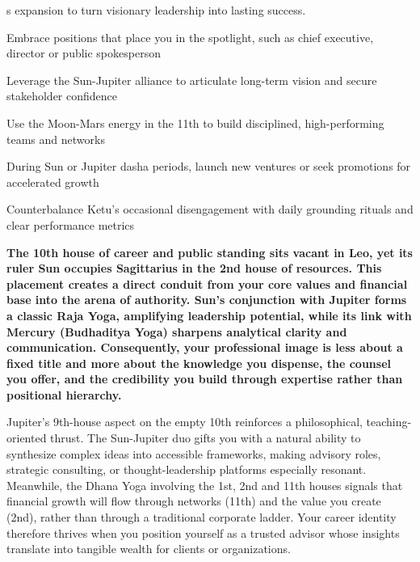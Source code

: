 {\fontsize{9}{13}\selectfont s expansion to turn visionary leadership into lasting success.}\par\vspace{1.8mm}

\begin{diamondlist}
  \item {\fontsize{8.5}{12}\selectfont Embrace positions that place you in the spotlight, such as chief executive, director or public spokesperson}
  \item {\fontsize{8.5}{12}\selectfont Leverage the Sun-Jupiter alliance to articulate long-term vision and secure stakeholder confidence}
  \item {\fontsize{8.5}{12}\selectfont Use the Moon-Mars energy in the 11th to build disciplined, high-performing teams and networks}
  \item {\fontsize{8.5}{12}\selectfont During Sun or Jupiter dasha periods, launch new ventures or seek promotions for accelerated growth}
  \item {\fontsize{8.5}{12}\selectfont Counterbalance Ketu's occasional disengagement with daily grounding rituals and clear performance metrics}
\end{diamondlist}


\label{topic12}

{\fontsize{9.5}{13.8}\selectfont\bfseries\color{DeepSlate} The 10th house of career and public standing sits vacant in Leo, yet its ruler Sun occupies Sagittarius in the 2nd house of resources. This placement creates a direct conduit from your core values and financial base into the arena of authority. Sun's conjunction with Jupiter forms a classic Raja Yoga, amplifying leadership potential, while its link with Mercury (Budhaditya Yoga) sharpens analytical clarity and communication. Consequently, your professional image is less about a fixed title and more about the knowledge you dispense, the counsel you offer, and the credibility you build through expertise rather than positional hierarchy.}\par\vspace{2mm}

{\fontsize{9}{13}\selectfont Jupiter's 9th-house aspect on the empty 10th reinforces a philosophical, teaching-oriented thrust. The Sun-Jupiter duo gifts you with a natural ability to synthesize complex ideas into accessible frameworks, making advisory roles, strategic consulting, or thought-leadership platforms especially resonant. Meanwhile, the Dhana Yoga involving the 1st, 2nd and 11th houses signals that financial growth will flow through networks (11th) and the value you create (2nd), rather than through a traditional corporate ladder. Your career identity therefore thrives when you position yourself as a trusted advisor whose insights translate into tangible wealth for clients or organizations.}\par\vspace{1.8mm}

